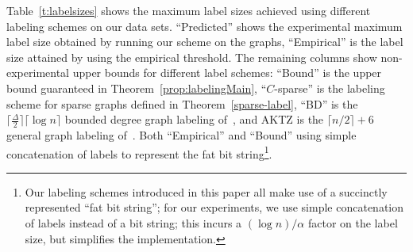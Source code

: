 Table~\ref{t:labelsizes}  shows
 the maximum label sizes achieved using different labeling schemes on our data sets. ``Predicted'' shows the experimental maximum label size obtained by running our scheme on the graphs, ``Empirical'' is the label size attained by using the empirical threshold. The remaining columns show non-experimental upper bounds for different label schemes: ``Bound'' is the upper bound guaranteed in Theorem~\ref{prop:labelingMain}, ``$C$-sparse'' is  the labeling scheme for sparse graphs defined in Theorem~\ref{sparse-label}, ``BD'' is the $\lceil \frac{\Delta}{2} \rceil \lceil \log n\rceil$ bounded degree graph  labeling of~\cite{adjiashvili2014labeling}, and AKTZ is the $\lceil n/2\rceil+6$ general graph  labeling of~\cite{alstrup2014adjacency}.
Both ``Empirical'' and  ``Bound'' using simple concatenation of labels to represent the fat bit string\footnote{Our labeling schemes introduced in this paper all make use of a succinctly represented ``fat bit string''; for our experiments, we use simple concatenation of labels instead of a bit string; this incurs a $(\log n)/\alpha$ factor on the label size, but simplifies the implementation.}.
 

